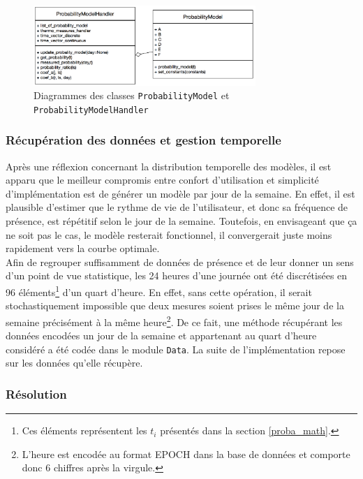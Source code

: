 \documentclass[11pt,a4paper,11pt]{report}
\begin{document}
\begin{figure}[h]
\centering
\includegraphics[width=0.75\textwidth]{images/Probability_class_diagram.png}
\caption{Diagrammes des classes \texttt{ProbabilityModel} et \texttt{ProbabilityModelHandler}}
\label{probability_class}
\end{figure}


\subsubsection{Récupération des données et gestion temporelle}
Après une réflexion concernant la distribution temporelle des modèles, il est apparu que le meilleur compromis entre confort d'utilisation et simplicité d'implémentation est de générer un modèle par jour de la semaine. En effet, il est plausible d'estimer que le rythme de vie de l'utilisateur, et donc sa fréquence de présence, est répétitif selon le jour de la semaine. Toutefois, en envisageant que ça ne soit pas le cas, le modèle resterait fonctionnel, il convergerait juste moins rapidement vers la courbe optimale.\\

Afin de regrouper suffisamment de données de présence et de leur donner un sens d'un point de vue statistique, les 24 heures d'une journée ont été discrétisées en 96 éléments\footnote{Ces éléments représentent les $t_{i}$ présentés dans la section \ref{proba_math}.} d'un quart d'heure. En effet, sans cette opération, il serait stochastiquement impossible que deux mesures soient prises le même jour de la semaine précisément à la même heure\footnote{L'heure est encodée au format EPOCH dans la base de données et comporte donc 6 chiffres après la virgule.}. De ce fait, une méthode récupérant les données encodées un jour de la semaine et appartenant au quart d'heure considéré a été codée dans le module \texttt{Data}. La suite de l'implémentation repose sur les données qu'elle récupère.

\subsubsection{Résolution}
\end{document}
